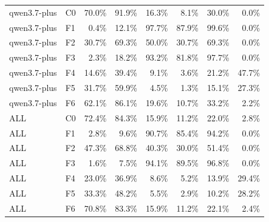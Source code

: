 \begin{tabular}{llrrrrrr}
qwen3.7-plus & C0 & 70.0\% & 91.9\% & 16.3\% & 8.1\% & 30.0\% & 0.0\% \\
qwen3.7-plus & F1 & 0.4\% & 12.1\% & 97.7\% & 87.9\% & 99.6\% & 0.0\% \\
qwen3.7-plus & F2 & 30.7\% & 69.3\% & 50.0\% & 30.7\% & 69.3\% & 0.0\% \\
qwen3.7-plus & F3 & 2.3\% & 18.2\% & 93.2\% & 81.8\% & 97.7\% & 0.0\% \\
qwen3.7-plus & F4 & 14.6\% & 39.4\% & 9.1\% & 3.6\% & 21.2\% & 47.7\% \\
qwen3.7-plus & F5 & 31.7\% & 59.9\% & 4.5\% & 1.3\% & 15.1\% & 27.3\% \\
qwen3.7-plus & F6 & 62.1\% & 86.1\% & 19.6\% & 10.7\% & 33.2\% & 2.2\% \\
ALL & C0 & 72.4\% & 84.3\% & 15.9\% & 11.2\% & 22.0\% & 2.8\% \\
ALL & F1 & 2.8\% & 9.6\% & 90.7\% & 85.4\% & 94.2\% & 0.0\% \\
ALL & F2 & 47.3\% & 68.8\% & 40.3\% & 30.0\% & 51.4\% & 0.0\% \\
ALL & F3 & 1.6\% & 7.5\% & 94.1\% & 89.5\% & 96.8\% & 0.0\% \\
ALL & F4 & 23.0\% & 36.9\% & 8.6\% & 5.2\% & 13.9\% & 29.4\% \\
ALL & F5 & 33.3\% & 48.2\% & 5.5\% & 2.9\% & 10.2\% & 28.2\% \\
ALL & F6 & 70.8\% & 83.3\% & 15.9\% & 11.2\% & 22.1\% & 2.4\% \\
\bottomrule
\end{tabular}

